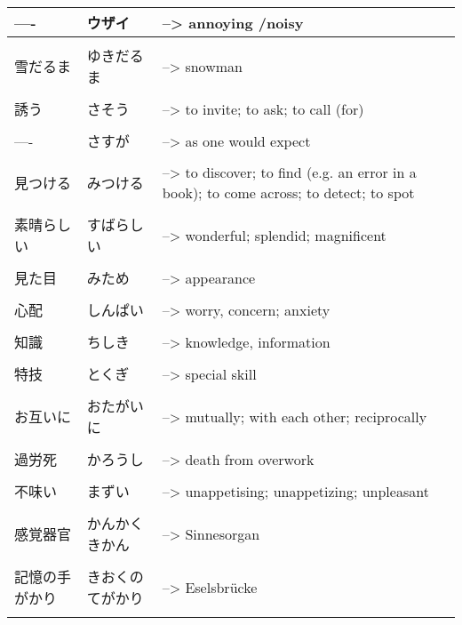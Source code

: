\documentclass{article}
\begin{document}
\begin{tabular}{ l | l p{14cm}  }
---- & ウザイ &--> annoying /noisy \\ \hline\\[-1em]
雪だるま & ゆきだるま &--> snowman \\ \hline\\[-1em]
誘う & さそう &--> to invite; to ask; to call (for) \\ \hline\\[-1em]
---- & さすが &--> as one would expect \\ \hline\\[-1em]
見つける & みつける &--> to discover; to find (e.g. an error in a book); to come across; to detect; to spot \\ \hline\\[-1em]
素晴らしい & すばらしい &--> wonderful; splendid; magnificent \\ \hline\\[-1em]
見た目 & みため &--> appearance \\ \hline\\[-1em]
心配 & しんぱい &--> worry, concern; anxiety \\ \hline\\[-1em]
知識 & ちしき &--> knowledge, information \\ \hline\\[-1em]
特技 & とくぎ &--> special skill \\ \hline\\[-1em]
お互いに & おたがいに &--> mutually; with each other; reciprocally \\ \hline\\[-1em]
過労死 & かろうし &--> death from overwork \\ \hline\\[-1em]
不味い & まずい &--> unappetising; unappetizing; unpleasant \\ \hline\\[-1em]
感覚器官 & かんかくきかん &--> Sinnesorgan \\ \hline\\[-1em]
記憶の手がかり & きおくのてがかり &--> Eselsbrücke \\ \hline\\[-1em]
\end{tabular}\\
\end{document}
